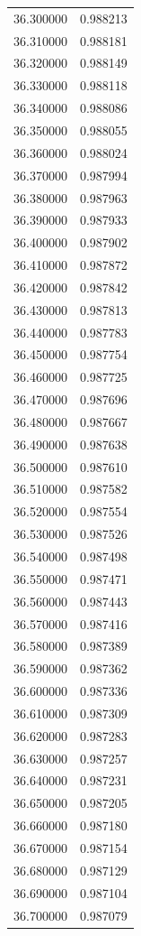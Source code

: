 \begin{tabular}{rr}
36.300000 & 0.988213 \\
36.310000 & 0.988181 \\
36.320000 & 0.988149 \\
36.330000 & 0.988118 \\
36.340000 & 0.988086 \\
36.350000 & 0.988055 \\
36.360000 & 0.988024 \\
36.370000 & 0.987994 \\
36.380000 & 0.987963 \\
36.390000 & 0.987933 \\
36.400000 & 0.987902 \\
36.410000 & 0.987872 \\
36.420000 & 0.987842 \\
36.430000 & 0.987813 \\
36.440000 & 0.987783 \\
36.450000 & 0.987754 \\
36.460000 & 0.987725 \\
36.470000 & 0.987696 \\
36.480000 & 0.987667 \\
36.490000 & 0.987638 \\
36.500000 & 0.987610 \\
36.510000 & 0.987582 \\
36.520000 & 0.987554 \\
36.530000 & 0.987526 \\
36.540000 & 0.987498 \\
36.550000 & 0.987471 \\
36.560000 & 0.987443 \\
36.570000 & 0.987416 \\
36.580000 & 0.987389 \\
36.590000 & 0.987362 \\
36.600000 & 0.987336 \\
36.610000 & 0.987309 \\
36.620000 & 0.987283 \\
36.630000 & 0.987257 \\
36.640000 & 0.987231 \\
36.650000 & 0.987205 \\
36.660000 & 0.987180 \\
36.670000 & 0.987154 \\
36.680000 & 0.987129 \\
36.690000 & 0.987104 \\
36.700000 & 0.987079 \\

\end{tabular}

